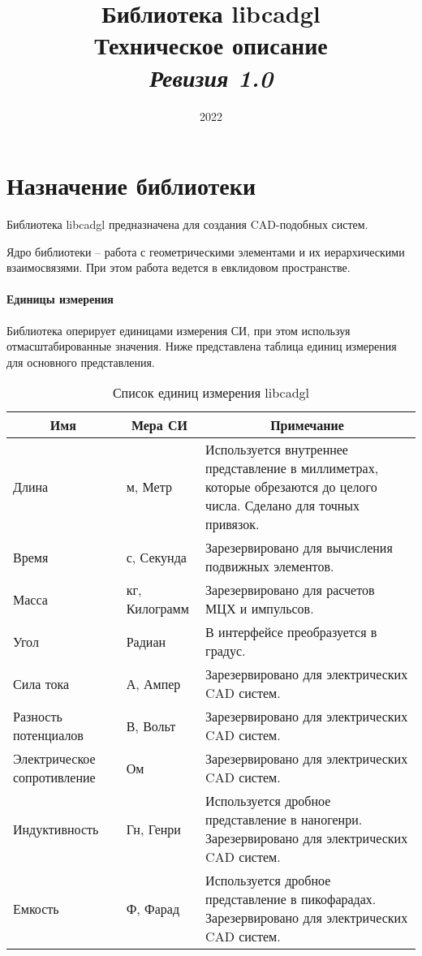 \documentclass[a4paper, 12pt]{article}
\title{Библиотека libcadgl \\ \small{Техническое описание} \\ \small{\textit{Ревизия 1.0}}}
\date{2022}
\begin{document}
\maketitle

\newpage
\tableofcontents

\newpage
\section{Назначение библиотеки}

Библиотека libcadgl предназначена для создания CAD-подобных систем.

Ядро библиотеки -- работа с геометрическими элементами и их иерархическими
взаимосвязями. При этом работа ведется в евклидовом пространстве.

\paragraph{Единицы измерения}
Библиотека оперирует единицами измерения СИ, при этом используя отмасштабированные
значения. Ниже представлена таблица единиц измерения для основного представления.

\begin{table}[!h]
  \caption{Список единиц измерения libcadgl}
  \label{table:si_units}
  \begin{tabular}{|p{3cm}|p{3cm}|p{7cm}|}
    \hline
    \multicolumn{1}{|c|}{\textbf{Имя}} & \multicolumn{1}{|c|}{\textbf{Мера СИ}} & \multicolumn{1}{|c|}{\textbf{Примечание}} \\ \hline
    Длина & м, Метр & Используется внутреннее представление в миллиметрах,
    которые обрезаются до целого числа. Сделано для точных привязок. \\ \hline
    Время & с, Секунда & Зарезервировано для вычисления подвижных элементов. \\ \hline
    Масса & кг, Килограмм & Зарезервировано для расчетов МЦХ и импульсов. \\ \hline
    Угол & Радиан & В интерфейсе преобразуется в градус. \\ \hline
    Сила тока & А, Ампер & Зарезервировано для электрических CAD систем. \\ \hline
    Разность потенциалов & В, Вольт & Зарезервировано для электрических CAD систем. \\ \hline
    Электрическое сопротивление & Ом & Зарезервировано для электрических CAD систем. \\ \hline
    Индуктивность & Гн, Генри & Используется дробное представление в наногенри. Зарезервировано для электрических CAD систем. \\ \hline
    Емкость & Ф, Фарад & Используется дробное представление в пикофарадах.
    Зарезервировано для электрических CAD систем. \\ \hline
  \end{tabular}
\end{table}
\end{document}
